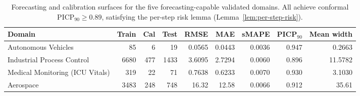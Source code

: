 \begin{table}[htbp]
\centering
\caption{Forecasting and calibration surfaces for the five forecasting-capable validated domains. All achieve conformal $\mathrm{PICP}_{90} \ge 0.89$, satisfying the per-step risk lemma (Lemma~\ref{lem:per-step-risk}).}
\label{tab:defended-domain-training-metrics}
\begin{tabular}{lrrrrrrrr}
\toprule
Domain & Train & Cal & Test & RMSE & MAE & sMAPE & PICP$_{90}$ & Mean width \\
\midrule
Autonomous Vehicles & 85 & 6 & 19 & 0.0565 & 0.0443 & 0.0036 & 0.947 & 0.2663 \\
Industrial Process Control & 6680 & 477 & 1433 & 3.6095 & 2.7294 & 0.0060 & 0.896 & 11.5782 \\
Medical Monitoring (ICU Vitals) & 319 & 22 & 71 & 0.7638 & 0.6233 & 0.0070 & 0.930 & 3.1030 \\
Aerospace & 3483 & 248 & 748 & 16.32 & 12.58 & 0.0066 & 0.912 & 35.61 \\
\bottomrule
\end{tabular}
\end{table}
